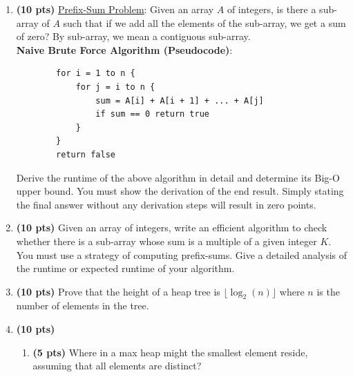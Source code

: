 \documentclass[12pt]{article}
\newif\ifans
\begin{document}
\begin{enumerate}
    \item \textbf{(10 pts)} \underline{Prefix-Sum Problem}: Given an array $A$ of integers, is there a sub-array of $A$ such that if we add all the elements of the sub-array, we get a sum of zero? By sub-array, we mean a contiguous sub-array. \\

    \textbf{Naive Brute Force Algorithm (Pseudocode)}:
    \begin{verbatim}
        for i = 1 to n {
            for j = i to n {
                sum = A[i] + A[i + 1] + ... + A[j]
                if sum == 0 return true
            }
        }
        return false
    \end{verbatim}
    Derive the runtime of the above algorithm in detail and determine its Big-O upper bound. You must show the derivation of the end result. Simply stating the final answer without any derivation steps will result in zero points.

    \ifans
    \color{blue}
    \color{black}
    \fi

    \hfill\break

    \item \textbf{(10 pts)} Given an array of integers, write an efficient algorithm to check whether there is a sub-array whose sum is a multiple of a given integer $K$. You must use a strategy of computing prefix-sums. Give a detailed analysis of the runtime or expected runtime of your algorithm. 
    
    \ifans
    \color{blue}
    \color{black}
    \fi

    \hfill\break

    \item \textbf{(10 pts)} Prove that the height of a heap tree is $\lfloor\log_2(n)\rfloor$ where $n$ is the number of elements in the tree.
    
    \ifans
    \color{blue}
    \color{black}
    \fi

    \hfill\break

    \item \textbf{(10 pts)}
    \begin{enumerate}
        \item \textbf{(5 pts)} Where in a max heap might the smallest element reside, assuming that all elements are distinct?
        
        \ifans
        \color{blue}
        \color{black}
        \fi
    
        \hfill\break


\end{enumerate}
\end{enumerate}
\end{document}
